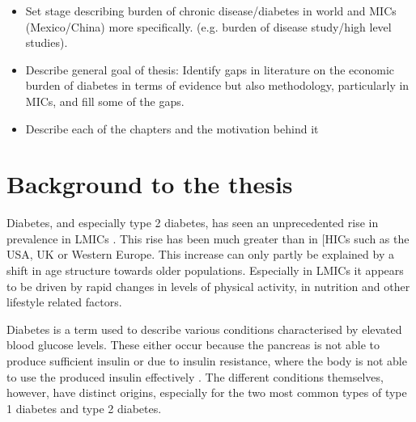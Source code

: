 
\begin{itemize}

\item Set stage describing burden of chronic disease/diabetes in world and MICs (Mexico/China) more specifically.  (e.g. burden of disease study/high level studies).
\item Describe general goal of thesis:
\subitem Identify gaps in literature on the economic burden of diabetes in terms of evidence but also methodology, particularly in MICs, and fill some of the gaps.
\item Describe each of the chapters and the motivation behind it
\subitem 
\end{itemize}

\section{Background to the thesis}

Diabetes, and especially type 2 diabetes, has seen an unprecedented rise in prevalence in \acp{LMIC} \parencite{Risk2016}. This rise has been much greater than in \acp{[HIC} such as the USA, UK or Western Europe. This increase can only partly be explained by a shift in age structure towards older populations. Especially in \acp{LMIC} it appears to be driven by rapid changes in levels of physical activity, in nutrition and other lifestyle related factors. 

Diabetes is a term used to describe various conditions characterised by elevated blood glucose levels. These either occur because the pancreas is not able to produce sufficient insulin or due to insulin resistance, where the body is not able to use the produced insulin effectively \parencite{WorldHealthOrganization2016}. The different conditions themselves, however, have distinct origins, especially for the two most common types of type 1 diabetes and type 2 diabetes. 

